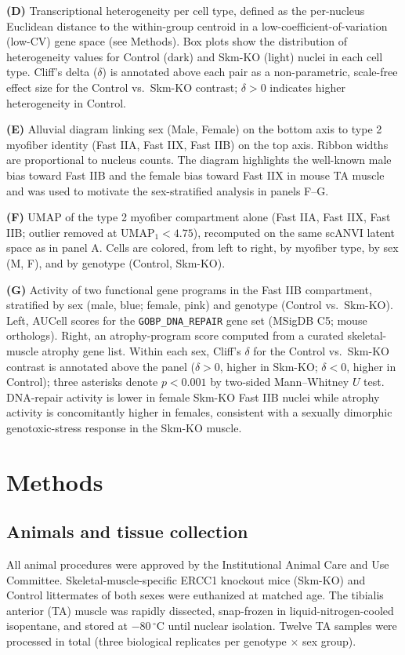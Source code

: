 \textbf{(D)} Transcriptional heterogeneity per cell type, defined as the per-nucleus Euclidean distance to the within-group centroid in a low-coefficient-of-variation (low-CV) gene space (see Methods). Box plots show the distribution of heterogeneity values for Control (dark) and Skm-KO (light) nuclei in each cell type. Cliff's delta ($\delta$) is annotated above each pair as a non-parametric, scale-free effect size for the Control vs.\ Skm-KO contrast; $\delta>0$ indicates higher heterogeneity in Control.

\textbf{(E)} Alluvial diagram linking sex (Male, Female) on the bottom axis to type 2 myofiber identity (Fast IIA, Fast IIX, Fast IIB) on the top axis. Ribbon widths are proportional to nucleus counts. The diagram highlights the well-known male bias toward Fast IIB and the female bias toward Fast IIX in mouse TA muscle and was used to motivate the sex-stratified analysis in panels F--G.

\textbf{(F)} UMAP of the type 2 myofiber compartment alone (Fast IIA, Fast IIX, Fast IIB; outlier removed at UMAP$_1 < 4.75$), recomputed on the same scANVI latent space as in panel A. Cells are colored, from left to right, by myofiber type, by sex (M, F), and by genotype (Control, Skm-KO).

\textbf{(G)} Activity of two functional gene programs in the Fast IIB compartment, stratified by sex (male, blue; female, pink) and genotype (Control vs.\ Skm-KO). Left, AUCell scores for the \texttt{GOBP\_DNA\_REPAIR} gene set (MSigDB C5; mouse orthologs). Right, an atrophy-program score computed from a curated skeletal-muscle atrophy gene list. Within each sex, Cliff's $\delta$ for the Control vs.\ Skm-KO contrast is annotated above the panel ($\delta > 0$, higher in Skm-KO; $\delta < 0$, higher in Control); three asterisks denote $p < 0.001$ by two-sided Mann--Whitney $U$ test. DNA-repair activity is lower in female Skm-KO Fast IIB nuclei while atrophy activity is concomitantly higher in females, consistent with a sexually dimorphic genotoxic-stress response in the Skm-KO muscle.

\vspace{1em}

\section*{Methods}

\subsection*{Animals and tissue collection}
All animal procedures were approved by the Institutional Animal Care and Use Committee. Skeletal-muscle-specific ERCC1 knockout mice (Skm-KO) and Control littermates of both sexes were euthanized at matched age. The tibialis anterior (TA) muscle was rapidly dissected, snap-frozen in liquid-nitrogen-cooled isopentane, and stored at $-80\,^{\circ}$C until nuclear isolation. Twelve TA samples were processed in total (three biological replicates per genotype $\times$ sex group).

